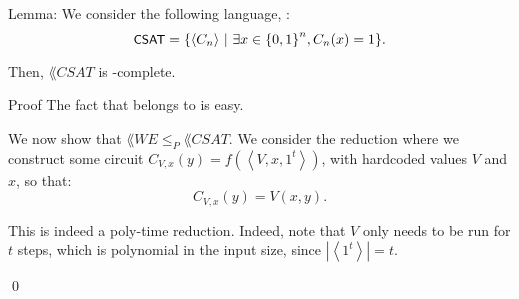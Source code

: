 \documentclass[a4paper]{article}
\begin{document}
\begin{parag}{Lemma: }
    We consider the following language, : 
    \[\lang{CSAT} = \left\{\left\langle C_n \right\rangle \suchthat \exists x \in \left\{0, 1\right\}^n, C_n\left(x\right) = 1\right\}.\]

    Then, $\lang{CSAT}$ is -complete.

    \begin{subparag}{Proof}
        The fact that  belongs to  is easy.

        We now show that $\lang{WE} \leq_P \lang{CSAT}$. We consider the reduction where we construct some circuit $C_{V, x}\left(y\right) = f\left(\left\langle V, x, 1^t \right\rangle\right)$, with hardcoded values $V$ and $x$, so that: 
        \[C_{V, x}\left(y\right) = V\left(x, y\right).\]

        This is indeed a poly-time reduction. Indeed, note that $V$ only needs to be run for $t$ steps, which is polynomial in the input size, since $\left|\left\langle 1^t \right\rangle\right| = t$.

        \qed
    \end{subparag}
\end{parag}
\end{document}
